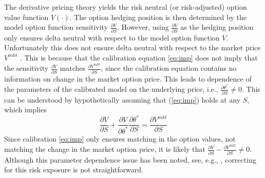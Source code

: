 \documentclass[letterpaper,12pt,titlepage,oneside,final]{book}
\numberwithin{equation}{section}
\theoremstyle{definition}
\newcommand{\Vmkt}{V^{mkt}}
\begin{document}
The derivative pricing theory yields the  risk neutral (or risk-adjusted) option value function $V(\cdot)$.
The option hedging position is then determined by the model option function sensitivity $\frac{\partial V}{\partial S}$. However, using $\frac{\partial V}{\partial S}$ as the hedging position only ensures delta neutral with respect to the model option function $V$. Unfortunately this does not ensure delta neutral with respect to the market price $V^{mkt}$ .
%
This is because that the calibration equation \eqref{eq:imp} does not imply that  the sensitivity $\frac{\partial V}{\partial S}$ matches $\frac{\partial \Vmkt}{\partial S}$, since the calibration equation contains no information on change in the market option price.
This leads to dependence of the parameters of the calibrated model on the underlying price, i.e., $\frac{\partial \theta^*}{\partial S} \neq 0$.
This can be understood by
hypothetically assuming that (\ref{eq:imp}) holds at any $S$, which implies
\begin{equation} 
\frac{\partial V}{\partial S} + \frac{\partial V}{\partial \theta^*}\frac{\partial \theta^*}{\partial S}=\frac{\partial \Vmkt}{\partial S}
\end{equation}
 Since calibration  \eqref{eq:imp} only ensures matching in the option values, not matching the change in the market option price, it is likely that $\frac{\partial V}{\partial S}-\frac{\partial \Vmkt}{\partial S} \neq 0$.  
 Although this parameter dependence issue has been noted,  see, e.g., \citep{coleman2001,hulloptimal}, correcting for this risk exposure is not straightforward.
\end{document}
